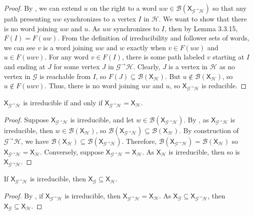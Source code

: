 \documentclass[hidelinks]{report}
\newcommand{\Gc}{\mathcal{G}}  %
\newcommand{\Hc}{\mathcal{H}}  %
\newcommand{\Bc}{\mathcal{B}}
\newcommand{\GtH}{{\Gc^\to\Hc}}
\newcommand{\shift}[1]{\mathsf{X}_{#1}}
\theoremstyle{definition}
\begin{document}
\begin{proof}
    By , we can extend \(u\) on the right to a word \(uw \in \Bc(\shift{\GtH})\)
    so that any path presenting \(uw\) synchronizes to a vertex \(I\) in \(\Hc\). 
    We want to show that there is no word joining \(uw\) and \(u\). As \(uw\)
    synchronizes to \(I\), then by \cite{lind1995introduction} Lemma 3.3.15, \(F(I) = F(uw)\). 
    From the definition of irreducibility and follower sets of words, we 
    can see \(v\) is a word joining \(uw\) and \(w\)
    exactly when \(v \in F(uw)\) and \(u \in F(uwv)\).
    For any word \(v \in F(I)\), there is some path labeled \(v\) starting 
    at \(I\) and ending at \(J\) for some vertex \(J\) in \(\GtH\). Clearly,
    \(J\) is a vertex in \(\Hc\) as no vertex in \(\Gc\) is reachable from \(I\), so 
    \(F(J) \subseteq \Bc(\shift{\Hc})\).
    But \(u \notin \Bc(\shift{\Hc})\), so \(u \notin F(uwv)\). Thus, there is no word joining
    \(uw\) and \(u\), so \(\shift{\GtH}\) is reducible.
\end{proof}

\begin{theorem}\label{irreq}
    \(\shift{\GtH}\) is irreducible if and only if \(\shift{\GtH} = \shift{\Hc}\).
\end{theorem}

\begin{proof}
    Suppose \(\shift{\GtH}\) is irreducible, and let \(w \in \Bc(\shift{\GtH})\). By , 
    as \(\shift{\GtH}\) is irreducible, then \(w \in \Bc(\shift{\Hc})\), so \(\Bc(\shift{\GtH}) \subseteq \Bc(\shift{\Hc})\).
    By construction of \(\GtH\), we have \(\Bc(\shift{\Hc}) \subseteq \Bc(\shift{\GtH})\). Therefore, 
    \(\Bc(\shift{\GtH}) = \Bc(\shift{\Hc})\) so \(\shift{\GtH} = \shift{\Hc}\).
    Conversely, suppose \(\shift{\GtH} = \shift{\Hc}\). As \(\shift{\Hc}\) is irreducible, then so 
    is \(\shift{\GtH}\).
\end{proof}

\begin{corollary}\label{irrsubshift}
    If \(\shift{\GtH}\) is irreducible, then \(\shift{\Gc} \subseteq \shift{\Hc}\).
\end{corollary}

\begin{proof}
    By , if \(\shift{\GtH}\) is irreducible, then \(\shift{\GtH} = \shift{\Hc}\).
    As \(\shift{\Gc} \subseteq \shift{\GtH}\), then \(\shift{\Gc} \subseteq \shift{\Hc}\).
\end{proof}
\end{document}
